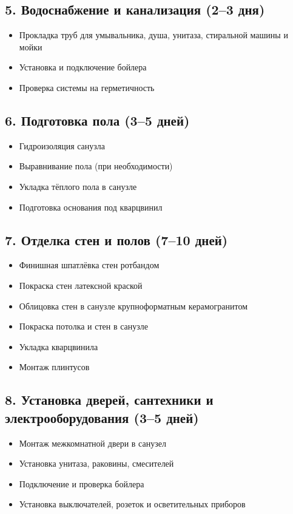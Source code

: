 \documentclass[11pt]{article}
\begin{document}
\subsection{5. Водоснабжение и канализация (2–3 дня)}
\label{sec:org984625e}

\begin{itemize}
\item Прокладка труб для умывальника, душа, унитаза, стиральной машины и мойки
\item Установка и подключение бойлера
\item Проверка системы на герметичность
\end{itemize}
\subsection{6. Подготовка пола (3–5 дней)}
\label{sec:org23e3e9f}

\begin{itemize}
\item Гидроизоляция санузла
\item Выравнивание пола (при необходимости)
\item Укладка тёплого пола в санузле
\item Подготовка основания под кварцвинил
\end{itemize}
\subsection{7. Отделка стен и полов (7–10 дней)}
\label{sec:orga7f3e36}

\begin{itemize}
\item Финишная шпатлёвка стен ротбандом
\item Покраска стен латексной краской
\item Облицовка стен в санузле крупноформатным керамогранитом
\item Покраска потолка и стен в санузле
\item Укладка кварцвинила
\item Монтаж плинтусов
\end{itemize}
\subsection{8. Установка дверей, сантехники и электрооборудования (3–5 дней)}
\label{sec:orgc70ca2b}

\begin{itemize}
\item Монтаж межкомнатной двери в санузел
\item Установка унитаза, раковины, смесителей
\item Подключение и проверка бойлера
\item Установка выключателей, розеток и осветительных приборов
\end{itemize}
\end{document}
